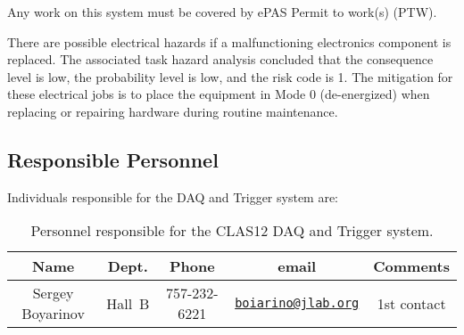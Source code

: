 Any work on this system must be covered by ePAS Permit to work(s) (PTW).

There are possible electrical hazards if a malfunctioning electronics component is replaced. 
The associated task hazard analysis concluded that the consequence level is low, the 
probability level is low, and the risk code is 1. The mitigation for these electrical jobs is 
to place the equipment in Mode 0 (de-energized) when replacing or repairing hardware during 
routine maintenance.

\subsection{Responsible Personnel}

Individuals responsible for the DAQ and Trigger system are:

\begin{table}[!htb]
\centering
\begin{tabular}{|c|c|c|c|c|} \hline
Name&Dept.&Phone&email&Comments \\ \hline
Sergey Boyarinov&Hall~B&757-232-6221&\href{mailto:boiarino@jlab.org}{\nolinkurl{boiarino@jlab.org}}&1st contact \\ \hline
 \end{tabular}
\caption{Personnel responsible for the CLAS12 DAQ and Trigger system.} 
\label{tb:daq}
\end{table}

